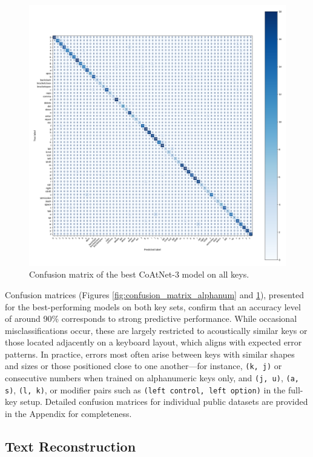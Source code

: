 \documentclass[a4paper,11pt,twoside]{report}
\theoremstyle{definition}
\begin{document}
\begin{figure}[h!]
  \centering
  \includegraphics[width=0.8\linewidth]{img_results/cm_all_CoAtNet_all.png}
  \caption{Confusion matrix of the best CoAtNet-3 model on all keys.}
  \label{fig:confusion_matrix_all}
\end{figure}

Confusion matrices (Figures \ref{fig:confusion_matrix_alphanum} and \ref{fig:confusion_matrix_all}), presented for the best-performing models on both key sets, confirm that an accuracy level of around 90\% corresponds to strong predictive performance. While occasional misclassifications occur, these are largely restricted to acoustically similar keys or those located adjacently on a keyboard layout, which aligns with expected error patterns. In practice, errors most often arise between keys with similar shapes and sizes or those positioned close to one another—for instance, \texttt{(k, j)} or consecutive numbers when trained on alphanumeric keys only, and \texttt{(j, u)}, \texttt{(a, s)}, \texttt{(l, k)}, or modifier pairs such as \texttt{(left control, left option)} in the full-key setup. Detailed confusion matrices for individual public datasets are provided in the Appendix for completeness.

\subsection*{Text Reconstruction}
\end{document}
